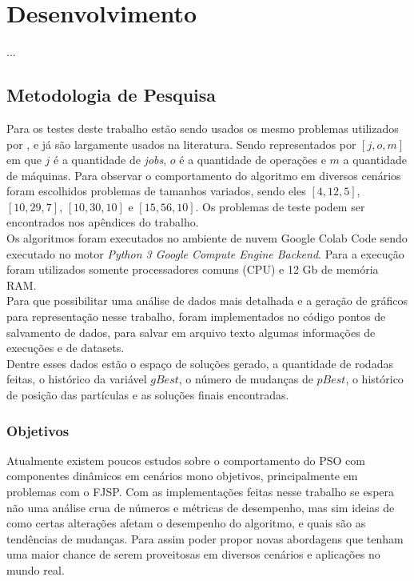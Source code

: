\chapter{Desenvolvimento}
    ...


\section{Metodologia de Pesquisa}
Para os testes deste trabalho estão sendo usados os mesmo problemas utilizados por \cite{Kacem2002}, e já são largamente usados na literatura. Sendo representados por $[j, o, m]$ em que $j$ é a quantidade de \textit{jobs}, $o$ é a quantidade de operações e $m$ a quantidade de máquinas. Para observar o comportamento do algoritmo em diversos cenários foram escolhidos problemas de tamanhos variados, sendo eles $[4, 12, 5]$, $[10, 29, 7]$, $[10, 30, 10]$ e $[15, 56, 10]$. Os problemas de teste podem ser encontrados nos apêndices do trabalho.\\
%
\indent Os algoritmos foram executados no ambiente de nuvem Google Colab Code sendo executado no motor \textit{Python 3 Google Compute Engine Backend}. Para a execução foram utilizados somente processadores comuns (CPU) e 12 Gb de memória RAM.\\
%

%
Para que possibilitar uma análise de dados mais detalhada e a geração de gráficos para representação nesse trabalho, foram implementados no código pontos de salvamento de dados, para salvar em arquivo texto algumas informações de execuções e de datasets.\\
Dentre esses dados estão o espaço de soluções gerado, a quantidade de rodadas feitas, o histórico da variável $gBest$, o número de mudanças de $pBest$, o histórico de posição das partículas e as soluções finais encontradas.

\subsection{Objetivos}
Atualmente existem poucos estudos sobre o comportamento do PSO com componentes dinâmicos em cenários mono objetivos, principalmente em problemas com o FJSP. 
%
Com as implementações feitas nesse trabalho se espera não uma análise crua de números e métricas de desempenho, mas sim ideias de como certas alterações afetam o desempenho do algoritmo, e quais são as tendências de mudanças.
%
Para assim poder propor novas abordagens que tenham uma maior chance de serem proveitosas em diversos cenários e aplicações no mundo real.


